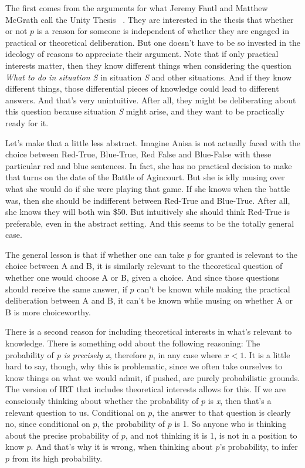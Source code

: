 \documentclass[11pt,]{book}
\begin{document}
The first comes from the arguments for what Jeremy Fantl and Matthew McGrath call the Unity Thesis ~\citep[ 73--6]{FantlMcGrath2009}. They are interested in the thesis that whether or not \(p\) is a reason for someone is independent of whether they are engaged in practical or theoretical deliberation. But one doesn't have to be so invested in the ideology of reasons to appreciate their argument. Note that if only practical interests matter, then they know different things when considering the question \emph{What to do in situation \emph{S}} in situation \emph{S} and other situations. And if they know different things, those differential pieces of knowledge could lead to different answers. And that's very unintuitive. After all, they might be deliberating about this question because situation \emph{S} might arise, and they want to be practically ready for it.

Let's make that a little less abstract. Imagine Anisa is not actually faced with the choice between Red-True, Blue-True, Red False and Blue-False with these particular red and blue sentences. In fact, she has no practical decision to make that turns on the date of the Battle of Agincourt. But she is idly musing over what she would do if she were playing that game. If she knows when the battle was, then she should be indifferent between Red-True and Blue-True. After all, she knows they will both win \$50. But intuitively she should think Red-True is preferable, even in the abstract setting. And this seems to be the totally general case.

The general lesson is that if whether one can take \(p\) for granted is relevant to the choice between A and B, it is similarly relevant to the theoretical question of whether one would choose A or B, given a choice. And since those questions should receive the same answer, if \(p\) can't be known while making the practical deliberation between A and B, it can't be known while musing on whether A or B is more choiceworthy.

There is a second reason for including theoretical interests in what's relevant to knowledge. There is something odd about the following reasoning: The probability of \emph{p is precisely x}, therefore \(p\), in any case where \(x < 1\). It is a little hard to say, though, why this is problematic, since we often take ourselves to know things on what we would admit, if pushed, are purely probabilistic grounds. The version of IRT that includes theoretical interests allows for this. If we are consciously thinking about whether the probability of \(p\) is \emph{x}, then that's a relevant question to us. Conditional on \(p\), the answer to that question is clearly no, since conditional on \(p\), the probability of \(p\) is 1. So anyone who is thinking about the precise probability of \(p\), and not thinking it is 1, is not in a position to know \(p\). And that's why it is wrong, when thinking about \(p\)'s probability, to infer \(p\) from its high probability.
\end{document}
